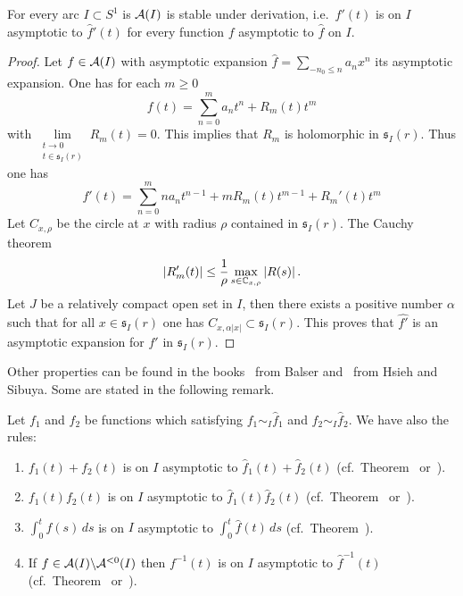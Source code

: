 \begin{prop}\label{prop:optionsOfAsymptoticExp}
  For every arc $I\subset S^1$ is $\mathcal{A}(I)$ is stable under derivation, i.e.\
  $f'(t)$ is on $I$ asymptotic to $\hat f'(t)$ for every function $f$
  asymptotic to $\hat f$ on $I$.
\end{prop}
\begin{proof}
  Let $f\in\mathcal{A}(I)$ with asymptotic expansion $\hat f=\sum_{-n_0\leq n}a_nx^n$
  its asymptotic expansion.
  One has for each $m\geq0$
  \[
    f(t)=\sum_{n=0}^ma_nt^n+R_m(t)t^m
  \]
  with $\underset{\substack{t\to0\\t\in\mathfrak{s}_I(r)}}{\lim}R_m(t)=0$.
  This implies that $R_m$ is holomorphic in $\mathfrak{s}_I(r)$.
  Thus one has
  \[
    f'(t)=\sum_{n=0}^mna_nt^{n-1}+mR_m(t)t^{m-1}+R_m'(t)t^m
  \]
  Let $C_{x,\rho}$ be the circle at $x$ with radius $\rho$ contained in
  $\mathfrak{s}_I(r)$. The Cauchy theorem \rewrite{implies then that}
  \[
    |R_m'(t)|\leq\frac{1}{\rho}\max_{s\in\mathbb{C}_{x,\rho}}|R(s)| \,.
  \]
  Let $J$ be a relatively compact open set in $I$, then there exists a positive
  number $\alpha$ such that for all $x\in\mathfrak{s}_I(r)$ one has
  $C_{x,\alpha|x|}\subset\mathfrak{s}_I(r)$.
  \TODO{}
  This proves that $\hat{f'}$ is an asymptotic expansion for $f'$ in
  $\mathfrak{s}_I(r)$.
\end{proof}
Other properties can be found in the books~\cite{Balser2000Formal} from Balser
and~\cite{hsieh2012basic} from Hsieh and Sibuya. Some are stated in the
following remark.
\begin{rem}
  Let $f_1$ and $f_2$ be functions which satisfying $f_1\sim_I\hat f_1$ and
  $f_2\sim_I\hat f_2$.
  We have also the rules:
  \begin{enumerate}
    \item $f_1(t)+f_2(t)$ is on $I$ asymptotic to $\hat f_1(t)+\hat f_2(t)$
      (cf.\ Theorem~\cite[4.5.Thm.13]{Balser2000Formal}
      or~\cite[XI-1-6]{hsieh2012basic}).
    \item $f_1(t)f_2(t)$ is on $I$ asymptotic to $\hat f_1(t)\hat f_2(t)$
      (cf.\ Theorem~\cite[4.5.Thm.14]{Balser2000Formal}
      or~\cite[XI-1-6]{hsieh2012basic}).
    \item $\int_0^tf(s)\,ds$ is on $I$ asymptotic to $\int_0^t\hat f(t)\,ds$
      (cf.\ Theorem~\cite[4.5.Thm.20]{Balser2000Formal}).
    \item If $f\in\mathcal{A}(I)\backslash\mathcal{A}^{<0}(I)$ then $f^{-1}(t)$ is on $I$
      asymptotic to $\hat f^{-1}(t)$
      (cf.\ Theorem~\cite[4.5.Thm.21]{Balser2000Formal}
      or~\cite[XI-1-9]{hsieh2012basic}).
  \end{enumerate}
\end{rem}

